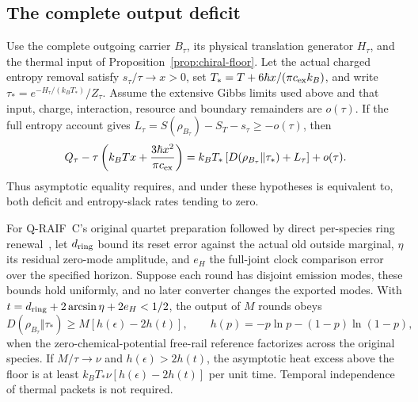 \subsection{The complete output deficit}

\begin{proposition}
\label{prop:export-deficit}
Use the complete outgoing carrier $B_\tau$, its physical translation
generator $H_\tau$, and the thermal input of
Proposition~\ref{prop:chiral-floor}. Let the actual charged entropy
removal satisfy $s_\tau/\tau\to x>0$, set
$T_*=T+6\hbar x/(\pi c_{\rm ex}k_B)$, and write
$\tau_*=e^{-H_\tau/(k_BT_*)}/Z_\tau$.
Assume the extensive Gibbs limits used above and that input, charge,
interaction, resource and boundary remainders are $o(\tau)$.
If the full entropy account gives
$L_\tau=S(\rho_{B_\tau})-S_T-s_\tau\ge-o(\tau)$, then
\begin{equation}
 Q_\tau-\tau\left(k_BTx+\frac{3\hbar x^2}{\pi c_{\rm ex}}\right)
 =k_BT_*\left[D(\rho_{B_\tau}\Vert\tau_*)+L_\tau\right]+o(\tau).
 \label{eq:output-deficit}
\end{equation}
Thus asymptotic equality requires, and under these hypotheses is
equivalent to, both deficit and entropy-slack rates tending to zero.

For Q-RAIF~C's original quartet preparation followed by direct
per-species ring renewal~\cite{QRC}, let $d_{\rm ring}$ bound its
reset error against the actual old outside marginal, $\eta$ its
residual zero-mode amplitude, and $e_H$ the full-joint clock comparison
error over the specified horizon. Suppose each round has disjoint
emission modes, these bounds hold uniformly, and no later converter
changes the exported modes. With
$t=d_{\rm ring}+2\arcsin\eta+2e_H<1/2$, the output of $M$ rounds obeys
\begin{equation}
 D(\rho_{B_\tau}\Vert\tau_*)\ge
 M\left[h(\epsilon)-2h(t)\right],
 \qquad h(p)=-p\ln p-(1-p)\ln(1-p),
 \label{eq:direct-export-deficit}
\end{equation}
when the zero-chemical-potential free-rail reference factorizes across
the original species. If $M/\tau\to\nu$ and $h(\epsilon)>2h(t)$,
the asymptotic heat excess above the floor is at least
$k_BT_*\nu[h(\epsilon)-2h(t)]$ per unit time.
Temporal independence of thermal packets is not required.
\end{proposition}
